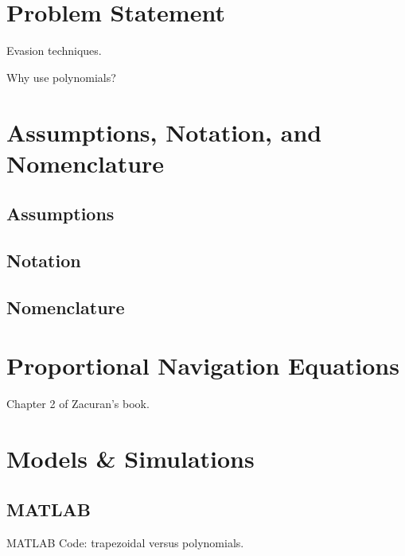 \section{Problem Statement}
Evasion techniques.

Why use polynomials?

\section{Assumptions, Notation, and Nomenclature}
\subsection*{Assumptions}

\subsection*{Notation}

\subsection*{Nomenclature}


\section{Proportional Navigation Equations}
Chapter 2 of Zacuran's book.

\section{Models \& Simulations}

\subsection{MATLAB}
MATLAB Code: trapezoidal versus polynomials.

